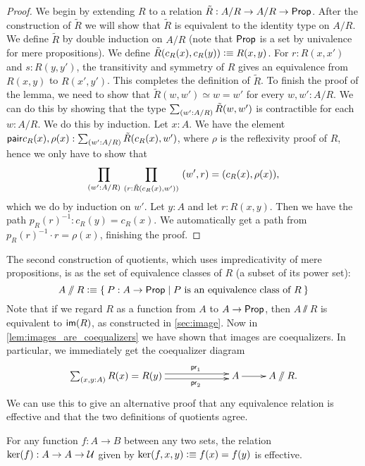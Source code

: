 \begin{proof}
We begin by extending $R$ to a relation $\tilde{R}:A/R\to A/R\to\mathsf{Prop}$. After
the construction of $\tilde{R}$ we will show that $\tilde{R}$ is equivalent
to the identity type on $A/R$. We define $\tilde{R}$ by double induction on
$A/R$ (note that $\mathsf{Prop}$ is a set by univalence for mere propositions). We
define $\tilde{R}(c_R(x),c_R(y)) \vcentcolon\equiv R(x,y)$. For $r:R(x,x')$ and $s:R(y,y')$,
the transitivity and symmetry 
of $R$ gives an equivalence from $R(x,y)$ to $R(x',y')$. This completes the
definition of $\tilde{R}$. To finish the proof of the lemma, we need
to show that $\tilde{R}(w,w')\simeq w= w'$ for every $w,w':A/R$. We can
do this by showing that the type $\sm{w':A/R} \tilde{R}(w,w')$ is contractible for
each $w:A/R$. We do this by induction. Let $x:A$. We have the element
$\pair{c_R(x),\rho(x)}:\sm{w':A/R} \tilde{R}(c_R(x),w')$, where $\rho$ is
the reflexivity proof of $R$, hence we only
have to show that
\begin{equation*}
\prd{w':A/R}{r:\tilde{R}(c_R(x),w')} \pairr{w',r}=\pairr{c_R(x),\rho(x)},
\end{equation*}
which we do by induction on $w'$. Let $y:A$ and let $r:R(x,y)$. Then we have
the path $p_R(r)^{-1}:c_R(y)= c_R(x)$. We automatically get a path from
$p_R(r)^{-1}\cdot r=\rho(x)$, finishing the proof.
\end{proof}

The second construction of quotients, which uses impredicativity of mere propositions, is as the set of equivalence classes of $R$ (a subset
of its power set):
\[ A\sslash R \defeq \setof{ P:A\to\prop | P \text{ is an equivalence class of } R} \]
Note that if we regard $R$ as a function from $A$ to $A\to \mathsf{Prop}$, then $A\sslash R$ is equivalent to $\mathsf{im}(R)$, as constructed in \autoref{sec:image}.
Now in \autoref{lem:images_are_coequalizers} we have shown that images are
coequalizers. In particular, we immediately get the coequalizer diagram
\begin{equation*}
  \xymatrix{
    **[l]{\sm{x,y:A} R (x)= R (y)}
    \ar@<0.25em>[r]^{\proj1}
    \ar@<-0.25em>[r]_{\proj2}
    &
    {A}
    \ar[r]
    &
    {A \sslash R.}
  }
\end{equation*}
We can use this to give an alternative proof that any equivalence relation is effective and that the two definitions of quotients agree.

\begin{thm}\label{prop:kernels_are_effective}
For any function $f:A\to B$ between any two sets, 
the relation $\ker(f):A\to A\to\mathcal{U}$ given by 
$\ker(f,x,y)\vcentcolon\equiv f(x)= f(y)$ is effective. 
\end{thm}

